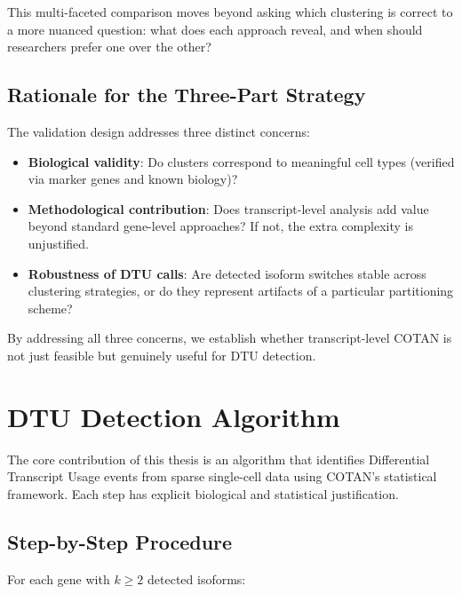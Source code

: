 This multi-faceted comparison moves beyond asking which clustering is correct to a more nuanced question: what does each approach reveal, and when should researchers prefer one over the other?

\subsection*{Rationale for the Three-Part Strategy}

The validation design addresses three distinct concerns:

\begin{itemize}
    \item \textbf{Biological validity}: Do clusters correspond to meaningful cell types (verified via marker genes and known biology)?
    \item \textbf{Methodological contribution}: Does transcript-level analysis add value beyond standard gene-level approaches? If not, the extra complexity is unjustified.
    \item \textbf{Robustness of DTU calls}: Are detected isoform switches stable across clustering strategies, or do they represent artifacts of a particular partitioning scheme?
\end{itemize}

By addressing all three concerns, we establish whether transcript-level COTAN is not just feasible but genuinely useful for DTU detection.

\section{DTU Detection Algorithm}\label{sec:methods-dtu-algorithm}

The core contribution of this thesis is an algorithm that identifies Differential Transcript Usage events from sparse single-cell data using COTAN's statistical framework. Each step has explicit biological and statistical justification.

\subsection*{Step-by-Step Procedure}

For each gene with $k \ge 2$ detected isoforms:

